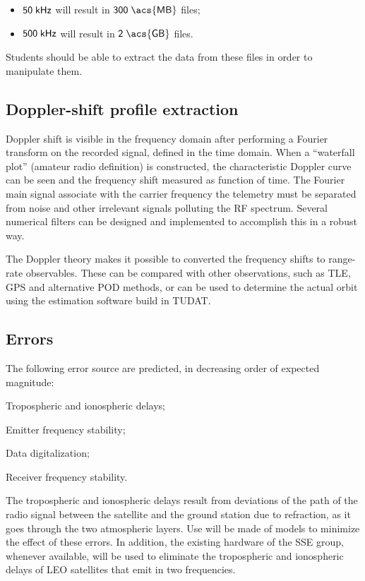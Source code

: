 \documentclass[11pt,a4paper,oneside]{article}
\newcommand{\listskip}{0pt}
\newenvironment{itemize*}
{\begin{itemize}
  \setlength{\itemsep}{\listskip}
  \setlength{\parskip}{\listskip}
  \setlength{\parsep}{\listskip}}
{\end{itemize}}
\newcommand{\unit}[2]{$ {\sf #1}\thickspace{\sf #2}$}
\newcommand{\quotes}[1]{``#1''}
\begin{document}
\begin{itemize}
\item \unit{50}{kHz} will result in \unit{300}{\acs{MB}} files;
\item \unit{500}{kHz} will result in \unit{2}{\acs{GB}} files.
\end{itemize}

Students should be able to extract the data from these files in order to manipulate them.



\subsection{Doppler-shift profile extraction}

Doppler shift is visible in the frequency domain after performing a Fourier transform on the recorded signal, defined in the time domain. When a \quotes{waterfall plot} (amateur radio definition) is constructed, the characteristic Doppler curve can be seen and the frequency shift measured as function of time. The Fourier main signal associate with the carrier frequency the telemetry must be separated from noise and other irrelevant signals polluting the \ac{RF} spectrum. Several numerical filters can be designed and implemented to accomplish this in a robust way.

The Doppler theory makes it possible to converted the frequency shifts to range-rate observables. These can be compared with other observations, such as \ac{TLE}, \ac{GPS} and alternative \ac{POD} methods, or can be used to determine the actual orbit using the estimation software build in \ac{TUDAT}.



\subsection{Errors}

The following error source are predicted, in decreasing order of expected magnitude:

\begin{itemize*}
\item Tropospheric and ionospheric delays;
\item Emitter frequency stability;
\item Data digitalization;
\item Receiver frequency stability.
\end{itemize*}

The tropospheric and ionospheric delays result from deviations of the path of the radio signal between the satellite and the ground station due to refraction, as it goes through the two atmospheric layers. Use will be made of models to minimize the effect of these errors. In addition, the existing hardware of the \ac{SSE} group, whenever available, will be used to eliminate the tropospheric and ionospheric delays of \ac{LEO} satellites that emit in two frequencies.
\end{document}
